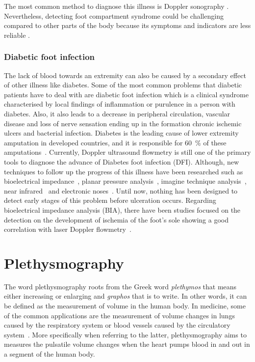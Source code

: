 The most common method to diagnose this illness is Doppler sonography \cite{chhabra2013compartment}. Nevertheless, detecting foot compartment syndrome could be challenging compared to other parts of the body because its symptoms and indicators are less reliable \cite{dodd2013foot}.

\subsubsection{Diabetic foot infection}
\label{section literature 2.3} 
The lack of blood towards an extremity can also be caused by a secondary effect of other illness like diabetes. Some of the most common problems that diabetic patients have to deal with are diabetic foot infection which is a clinical syndrome characterised by local findings of inflammation or purulence in a person with diabetes. Also, it also leads to a decrease in peripheral circulation, vascular disease and loss of nerve sensation ending up in the formation chronic ischemic ulcers and bacterial infection. Diabetes is the leading cause of lower extremity amputation in developed countries, and it is responsible for \SI{60}{\percent} of these amputations~\cite{ucckay2014diabetic}.  Currently, Doppler ultrasound flowmetry is still one of the primary tools to diagnose the advance of Diabetes foot infection (DFI). Although, new techniques to follow up the progress of this illness have been researched such as bioelectrical impedance~\cite{cheng2012application}, planar pressure analysis~\cite{dos2010insole}, imagine technique analysis~\cite{songer2001tissue}, near infrared~\cite{papazoglou2008assessment} and electronic noses~\cite{yusuf2013diagnosis}. Until now, nothing has been designed to detect early stages of this problem before ulceration occurs. Regarding bioelectrical impedance analysis (BIA), there have been studies focused on the detection on the development of ischemia of the foot's sole showing a good correlation with laser Doppler flowmetry~\cite{cheng2012application}. 

\section{Plethysmography}
\label{section literature 3}
The word plethysmography roots from the Greek word \textit{plethymos} that means either increasing or enlarging and \textit{graphos} that is to write. In other words, it can be defined as the measurement of volume in the human body. In medicine, some of the common applications are the measurement of volume changes in lungs caused by the respiratory system or blood vessels caused by the circulatory system~\cite{turcott2004methods}.  More specifically when referring to the latter, plethysmography aims to measures the pulsatile volume changes when the heart pumps blood in and out in a segment of the human body. 



